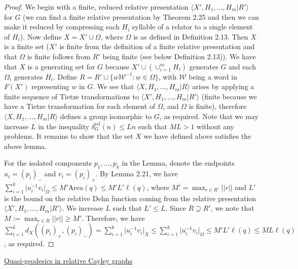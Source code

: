 \documentclass[12pt]{article}
\newcommand{\vs}{\vskip10pt}
\begin{document}
	\begin{proof}
		
		We begin with a finite, reduced relative presentation $\langle X', H_1,...,H_m \vert R' \rangle$ for $G$ (we can find a finite relative presentation by Theorem 2.25 and then we can make it reduced by compressing each $H_i$ syllable of a relator to a single element of $H_i$). Now define $X = X' \cup \Omega$, where $\Omega$ is as defined in Definition 2.13. Then $X$ is a finite set ($X'$ is finite from the definition of a finite relative presentation and that $\Omega$ is finite follows from $R'$ being finite (see below Definition 2.13)). We have that $X$ is a generating set for $G$ because $X' \cup (\cup_{i=1}^m H_i)$ generates $G$ and each $\Omega_i$ generates $H_i$. Define $R = R' \cup \{w \mathcal{W}^{-1}: w \in \Omega\}$, with $\mathcal{W}$ being a word in $F(X')$ representing $w$ in $G$. We see that $\langle X, H_1,...,H_m \vert R \rangle$ arises by applying a finite sequence of Tietze transformations to $\langle X', H_1,...,H_m \vert R' \rangle$ (finite because we have a Tietze transformation for each element of $\Omega$, and $\Omega$ is finite), therefore $\langle X, H_1,...,H_m \vert R \rangle$ defines a group isomorphic to $G$, as required. Note that we may increase $L$ in the inequality $\delta^{\text{rel}}_G(n) \leq Ln$ such that $ML > 1$ without any problems. It remains to show that the set $X$ we have defined above satisfies the above lemma. 
		
		\vs 
		
		For the isolated components $p_1,...,p_k$ in the Lemma, denote the endpoints $u_i = (p_i)_-$ and $v_i = (p_i)_+$. By Lemma 2.21, we have $\sum_{i = 1}^k \vert u_i^{-1} v_i \vert_{\Omega} \leq M' \text{Area}(q) \leq M' L' \ell(q)$, where $M' = \max_{r \in R'} \vert \vert r \vert \vert$ and $L'$ is the bound on the relative Dehn function coming from the relative presentation $\langle X', H_1,...,H_m \vert R' \rangle$. We increase $L$ such that $L' \leq L$. Since $R \supseteq R'$, we note that $M:= \max_{r \in R} \vert \vert r \vert \vert \geq M'$. Therefore, we have $\sum_{i=1}^k d_X((p_i)_+, (p_i)_-) = \sum_{i=1}^k \vert u_i^{-1} v_i \vert_X \leq \sum_{i=1}^k \vert u_i^{-1}v_i \vert_{\Omega} \leq M' L' \ell(q) \leq ML \ell(q)$, as required. 
		
	\end{proof}
	
	\vs
	
	\underline{Quasi-geodesics in relative Cayley graphs}
	
\end{document}
